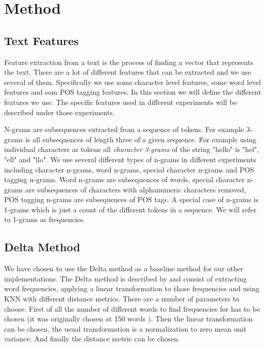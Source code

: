 \section{Method}

\subsection{Text Features}
Feature extraction from a text is the process of finding a vector that
represents the text. There are a lot of different features that can be extracted
and we use several of them. Specifically we use some character level features,
some word level features and som \gls{POS} tagging features. In this section
we will define the different features we use. The specific features used in
different experiments will be described under those experiments.

N-grams are subsequences extracted from a sequence of tokens. For example
3-grams is all subsequences of length three of a given sequence. For example
using individual characters as tokens all \textit{character 3-grams} of the
string "hello" is "hel", "ell" and "llo". We use several different types of
n-grams in different experiments including character n-grams, word n-grams,
special character n-grams and \gls{POS} tagging n-grams. Word n-grams are
subsequences of words, special character n-grams are subsequences of characters
with alphanumeric characters removed, \gls{POS} tagging n-grams are subsequences
of \gls{POS} tags. A special case of n-grams is 1-grams which is just a count of
the different tokens in a sequence. We will refer to 1-grams as frequencies.

\subsection{Delta Method}
\label{subsec: Delta Method}
We have chosen to use the Delta method as a baseline method for our other
implementations. The Delta method is described by \cite{evert2015towards} and
consist of extracting word frequencies, applying a linear transformation to
those frequencies and using \gls{KNN} with different distance metrics. There are
a number of parameters to choose. First of all the number of different words to
find frequencies for has to be chosen (it was originally chosen at 150 words
\cite{evert2015towards}). Then the linear transformation can be chosen, the
usual transformation is a normalization to zero mean unit variance. And finally
the distance metric can be chosen.

